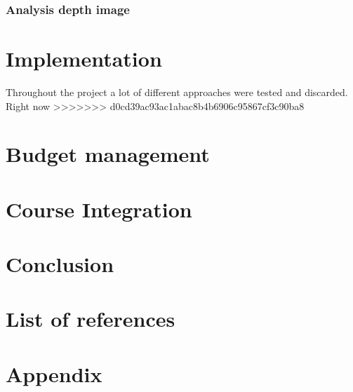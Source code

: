 \documentclass[11pt]{article}
\begin{document}
     


\subsubsection{Analysis depth image}

\section{Implementation}
Throughout the project a lot of different approaches were tested and discarded. Right now 
>>>>>>> d0cd39ac93ac1abac8b4b6906c95867cf3c90ba8

\section{Budget management}

\section{Course Integration}

\section{Conclusion}

\section{List of references}

\section{Appendix}
\end{document}
